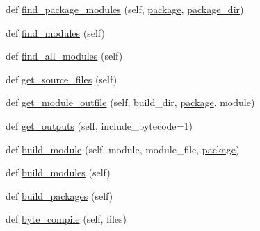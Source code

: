 \begin{DoxyCompactItemize}
def \hyperlink{classsetuptools_1_1__distutils_1_1command_1_1build__py_1_1build__py_a30053de0b378122147137c03cbd38e48}{find\+\_\+package\+\_\+modules} (self, \hyperlink{classsetuptools_1_1__distutils_1_1command_1_1build__py_1_1build__py_a9166969e65bc8431af32d65df47d6905}{package}, \hyperlink{classsetuptools_1_1__distutils_1_1command_1_1build__py_1_1build__py_ad5e418ba1d8aff7a25bf892ca801c3fa}{package\+\_\+dir})
\item 
def \hyperlink{classsetuptools_1_1__distutils_1_1command_1_1build__py_1_1build__py_aee8e63f33ecb396c42d4b130c05f29e1}{find\+\_\+modules} (self)
\item 
def \hyperlink{classsetuptools_1_1__distutils_1_1command_1_1build__py_1_1build__py_acc17df904675a286b22633aec7675692}{find\+\_\+all\+\_\+modules} (self)
\item 
def \hyperlink{classsetuptools_1_1__distutils_1_1command_1_1build__py_1_1build__py_a5ac3743b249316bfd0c83d406d4e0620}{get\+\_\+source\+\_\+files} (self)
\item 
def \hyperlink{classsetuptools_1_1__distutils_1_1command_1_1build__py_1_1build__py_ac4cc220d5f14e45e4b566ac25c275aa9}{get\+\_\+module\+\_\+outfile} (self, build\+\_\+dir, \hyperlink{classsetuptools_1_1__distutils_1_1command_1_1build__py_1_1build__py_a9166969e65bc8431af32d65df47d6905}{package}, module)
\item 
def \hyperlink{classsetuptools_1_1__distutils_1_1command_1_1build__py_1_1build__py_a2b8d8c8d9a8e945c61b14bb125619698}{get\+\_\+outputs} (self, include\+\_\+bytecode=1)
\item 
def \hyperlink{classsetuptools_1_1__distutils_1_1command_1_1build__py_1_1build__py_a21332bcead6c11a9154c5b9bea6498a5}{build\+\_\+module} (self, module, module\+\_\+file, \hyperlink{classsetuptools_1_1__distutils_1_1command_1_1build__py_1_1build__py_a9166969e65bc8431af32d65df47d6905}{package})
\item 
def \hyperlink{classsetuptools_1_1__distutils_1_1command_1_1build__py_1_1build__py_aad3b8af381f4122560d0f0f3ddaf5db1}{build\+\_\+modules} (self)
\item 
def \hyperlink{classsetuptools_1_1__distutils_1_1command_1_1build__py_1_1build__py_a2cd728de30f7224d31d8a0d0627bd039}{build\+\_\+packages} (self)
\item 
def \hyperlink{classsetuptools_1_1__distutils_1_1command_1_1build__py_1_1build__py_a35025668f2196c23335e62e543bc13ac}{byte\+\_\+compile} (self, files)
\end{DoxyCompactItemize}
